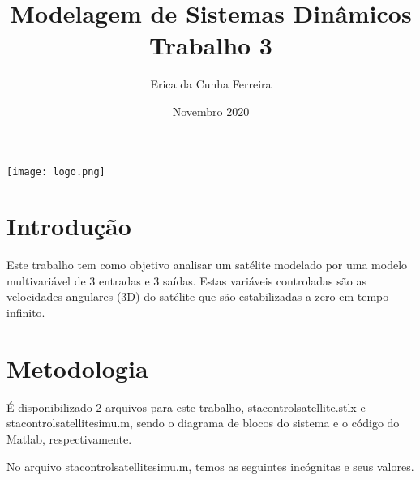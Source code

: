 \documentclass[12pt]{article}
\title{%
    Modelagem de Sistemas Dinâmicos\\ %
    \large Trabalho 3}
\author{Erica da Cunha Ferreira }
\date{Novembro 2020}
\begin{document}
\maketitle
{} 
\vspace{8cm} %
\begin{center}
    \texttt{[image: logo.png]}
\end{center}

\newpage
\tableofcontents
\newpage
{} 

\cleardoublepage{}
\section{Introdução}

\quad Este trabalho tem como objetivo analisar um satélite modelado por uma modelo multivariável de 3 entradas e 3 saídas. Estas variáveis controladas são as velocidades angulares (3D) do satélite que são estabilizadas a zero em tempo infinito.

\section{Metodologia}

\quad É disponibilizado 2 arquivos para este trabalho, sta\underline{\hspace{.05in}}control\underline{\hspace{.05in}}satellite.stlx e sta\underline{\hspace{.05in}}control\underline{\hspace{.05in}}satellite\underline{\hspace{.05in}}simu.m, sendo o diagrama de blocos do sistema e o código do Matlab, respectivamente.

\quad No arquivo sta\underline{\hspace{.05in}}control\underline{\hspace{.05in}}satellite\underline{\hspace{.05in}}simu.m, temos as seguintes incógnitas e seus valores. 
\end{document}
